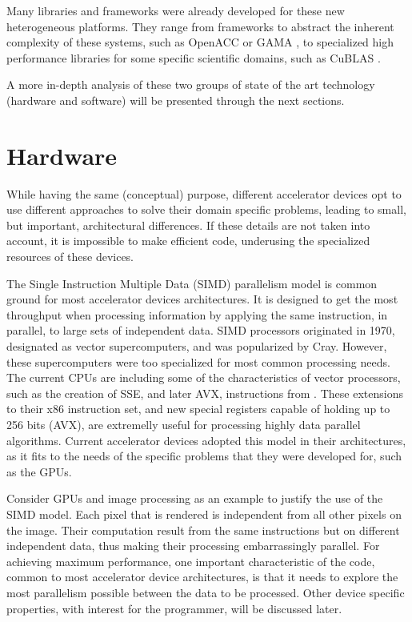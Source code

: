 Many libraries and frameworks were already developed for these new heterogeneous platforms. They range from frameworks to abstract the inherent complexity of these systems, such as OpenACC \cite{OpenACC} or GAMA \cite{GAMA}, to specialized high performance libraries for some specific scientific domains, such as CuBLAS \cite{NVIDIA:CuBLAS}.

A more in-depth analysis of these two groups of state of the art technology (hardware and software) will be presented through the next sections.

\section{Hardware}

While having the same (conceptual) purpose, different accelerator devices opt to use different approaches to solve their domain specific problems, leading to small, but important, architectural differences. If these details are not taken into account, it is impossible to make efficient code, underusing the specialized resources of these devices.

The Single Instruction Multiple Data (SIMD) parallelism model is common ground for most accelerator devices architectures. It is designed to get the most throughput when processing information by applying the same instruction, in parallel, to large sets of independent data. SIMD processors originated in 1970, designated as vector supercomputers, and was popularized by Cray. However, these supercomputers were too specialized for most common processing needs. The current CPUs are including some of the characteristics of vector processors, such as the creation of SSE, and later AVX, instructions from \intel. These extensions to their x86 instruction set, and new special registers capable of holding up to 256 bits (AVX), are extremelly useful for processing highly data parallel algorithms. Current accelerator devices adopted this model in their architectures, as it fits to the needs of the specific problems that they were developed for, such as the GPUs.

Consider GPUs and image processing as an example to justify the use of the SIMD model. Each pixel that is rendered is independent from all other pixels on the image. Their computation result from the same instructions but on different independent data, thus making their processing embarrassingly parallel. For achieving maximum performance, one important characteristic of the code, common to most accelerator device architectures, is that it needs to explore the most parallelism possible between the data to be processed. Other device specific properties, with interest for the programmer, will be discussed later.

